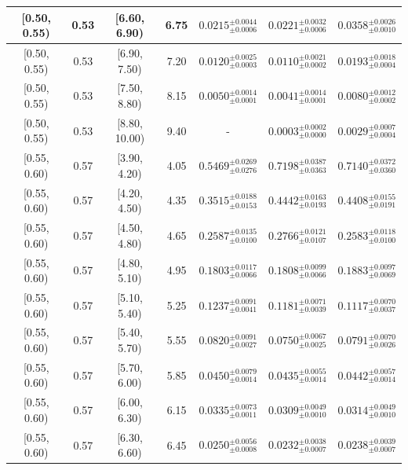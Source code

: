 \begin{longtable}{|c|c|c|c|c|c|c|}
\hline
[0.50, 0.55) & 0.53 & [6.60, 6.90) & 6.75 & $0.0215^{ \pm 0.0044 }_{ \pm 0.0006 }$ & $0.0221^{ \pm 0.0032 }_{ \pm 0.0006 }$ & $0.0358^{ \pm 0.0026 }_{ \pm 0.0010 }$ \\ 
\hline
[0.50, 0.55) & 0.53 & [6.90, 7.50) & 7.20 & $0.0120^{ \pm 0.0025 }_{ \pm 0.0003 }$ & $0.0110^{ \pm 0.0021 }_{ \pm 0.0002 }$ & $0.0193^{ \pm 0.0018 }_{ \pm 0.0004 }$ \\ 
\hline
[0.50, 0.55) & 0.53 & [7.50, 8.80) & 8.15 & $0.0050^{ \pm 0.0014 }_{ \pm 0.0001 }$ & $0.0041^{ \pm 0.0014 }_{ \pm 0.0001 }$ & $0.0080^{ \pm 0.0012 }_{ \pm 0.0002 }$ \\ 
\hline
[0.50, 0.55) & 0.53 & [8.80, 10.00) & 9.40 & - & $0.0003^{ \pm 0.0002 }_{ \pm 0.0000 }$ & $0.0029^{ \pm 0.0007 }_{ \pm 0.0004 }$ \\ 
\hline
[0.55, 0.60) & 0.57 & [3.90, 4.20) & 4.05 & $0.5469^{ \pm 0.0269 }_{ \pm 0.0276 }$ & $0.7198^{ \pm 0.0387 }_{ \pm 0.0363 }$ & $0.7140^{ \pm 0.0372 }_{ \pm 0.0360 }$ \\ 
\hline
[0.55, 0.60) & 0.57 & [4.20, 4.50) & 4.35 & $0.3515^{ \pm 0.0188 }_{ \pm 0.0153 }$ & $0.4442^{ \pm 0.0163 }_{ \pm 0.0193 }$ & $0.4408^{ \pm 0.0155 }_{ \pm 0.0191 }$ \\ 
\hline
[0.55, 0.60) & 0.57 & [4.50, 4.80) & 4.65 & $0.2587^{ \pm 0.0135 }_{ \pm 0.0100 }$ & $0.2766^{ \pm 0.0121 }_{ \pm 0.0107 }$ & $0.2583^{ \pm 0.0118 }_{ \pm 0.0100 }$ \\ 
\hline
[0.55, 0.60) & 0.57 & [4.80, 5.10) & 4.95 & $0.1803^{ \pm 0.0117 }_{ \pm 0.0066 }$ & $0.1808^{ \pm 0.0099 }_{ \pm 0.0066 }$ & $0.1883^{ \pm 0.0097 }_{ \pm 0.0069 }$ \\ 
\hline
[0.55, 0.60) & 0.57 & [5.10, 5.40) & 5.25 & $0.1237^{ \pm 0.0091 }_{ \pm 0.0041 }$ & $0.1181^{ \pm 0.0071 }_{ \pm 0.0039 }$ & $0.1117^{ \pm 0.0070 }_{ \pm 0.0037 }$ \\ 
\hline
[0.55, 0.60) & 0.57 & [5.40, 5.70) & 5.55 & $0.0820^{ \pm 0.0091 }_{ \pm 0.0027 }$ & $0.0750^{ \pm 0.0067 }_{ \pm 0.0025 }$ & $0.0791^{ \pm 0.0070 }_{ \pm 0.0026 }$ \\ 
\hline
[0.55, 0.60) & 0.57 & [5.70, 6.00) & 5.85 & $0.0450^{ \pm 0.0079 }_{ \pm 0.0014 }$ & $0.0435^{ \pm 0.0055 }_{ \pm 0.0014 }$ & $0.0442^{ \pm 0.0057 }_{ \pm 0.0014 }$ \\ 
\hline
[0.55, 0.60) & 0.57 & [6.00, 6.30) & 6.15 & $0.0335^{ \pm 0.0073 }_{ \pm 0.0011 }$ & $0.0309^{ \pm 0.0049 }_{ \pm 0.0010 }$ & $0.0314^{ \pm 0.0049 }_{ \pm 0.0010 }$ \\ 
\hline
[0.55, 0.60) & 0.57 & [6.30, 6.60) & 6.45 & $0.0250^{ \pm 0.0056 }_{ \pm 0.0008 }$ & $0.0232^{ \pm 0.0038 }_{ \pm 0.0007 }$ & $0.0238^{ \pm 0.0039 }_{ \pm 0.0007 }$ \\ 

\end{longtable}
